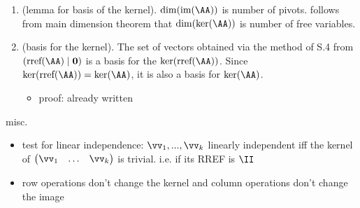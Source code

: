 \begin{enumerate}
\begin{itemize}
\begin{itemize}
            (Case: $\rref(\AA)$ has no pivot columns). Then $\rref(\AA) = \mathbf{0}$.

            (Case: $\rref(\AA)$ has pivot columns). 
            Let $x_{j_1}, ..., x_{j_p}$ be the pivot variables of $\rref(\AA)$ and let $x_{k_1}, ..., x_{k_q}$ be the free variables of $\rref(\AA)$. Now consider $\SS := \begin{pmatrix} \rr_{j_1} & \hdots & \rr_{j_p} & \rr_{k_1} & \hdots & \rr_{k_q} \end{pmatrix}$. Since for each $\alpha$, the vector $\rr_{j_\alpha}$ is the pivot column of index $\alpha$ from $\rref(\AA)$, then $\rr_{j_\alpha} = \see_{j_\alpha}$. Thus $\SS = \begin{pmatrix} \see_{j_1} & \hdots & \see_{j_p} & \rr_{k_1} & \hdots & \rr_{k_q} \end{pmatrix}$. Now, since row-reduction is an invertible linear operation, there is an invertible matrix $\RR$ for which $\rref(\AA) = \RR \AA$. We thus have $\AA = \RR^{-1} \rref(\AA)$, or equivalently, $\aa_i = \RR^{-1} \rr_i$.

            
            
            $= (\RR^{-1}\see_1, ..., \RR^{-1}\see_k, \RR^{-1}\bb_{k + 1}, ..., \RR^{-1}\bb_n)$. Recall from Theorem \ref{ch::lin_alg::lemma::only_inv_fns_preserve_lin_indep} that because $\RR^{-1}$ is invertible it preserves linear independence. Thus, since $\see_1, ..., \see_k$ are linearly independent, $\aa_1 = \RR^{-1} \see_1, ..., \aa_k = \RR^{-1} \see_k$ are linearly independent.

            [need to prove that $\see_1, ..., \see_k$ span $\im(\rref(\AA))$]
        \end{itemize}
    \end{itemize}
    \item (lemma for basis of the kernel). $\dim(\im(\AA))$ is number of pivots. follows from main dimension theorem that $\dim(\ker(\AA))$ is number of free variables.
    \item (basis for the kernel). The set of vectors obtained via the method of S.4 from $(\rref(\AA) \mid \mathbf{0})$ is a basis for the $\ker(\rref(\AA))$. Since $\ker(\rref(\AA)) = \ker(\AA)$, it is also a basis for $\ker(\AA)$.
    \begin{itemize}
        \item proof: already written
    \end{itemize}
\end{enumerate}

misc.
\begin{itemize}
    \item test for linear independence: $\vv_1, ..., \vv_k$ linearly independent iff the kernel of $\begin{pmatrix} \vv_1 & \hdots & \vv_k \end{pmatrix}$ is trivial. i.e. if its RREF is $\II$
    \item row operations don't change the kernel and column operations don't change the image
\end{itemize}

